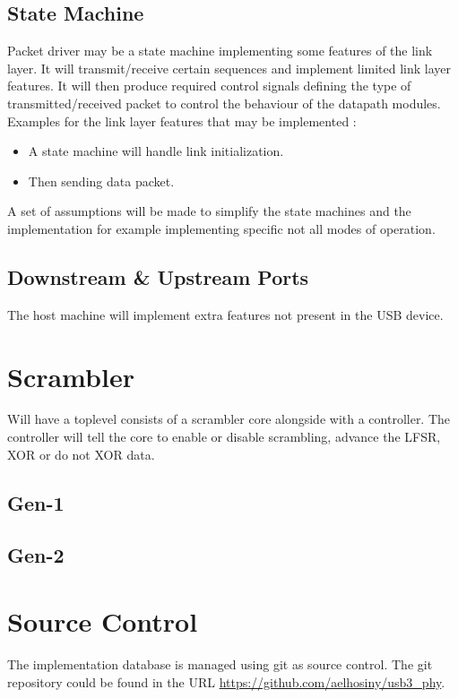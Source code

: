 \documentclass[11pt,a4paper]{article}
\begin{document}
\subsection{State Machine}
Packet driver may be a state machine implementing some features of the link layer. It will transmit/receive certain sequences and implement limited link layer features. It will then produce required control signals defining the type of transmitted/received packet to control the behaviour of the datapath modules.
Examples for the link layer features that may be implemented :
\begin{itemize}
	\item A state machine will handle link initialization.
	\item Then sending data packet.
\end{itemize}

A set of assumptions will be made to simplify the state machines and the implementation for example implementing specific not all modes of operation.

\subsection{Downstream \& Upstream Ports}
The host machine will implement extra features not present in the USB device.


\section{Scrambler}
Will have a toplevel consists of a scrambler core alongside with a controller. The controller will tell the core to enable or disable scrambling, advance the LFSR, XOR or do not XOR data.


\subsection{Gen-1}

\subsection{Gen-2}

\section{Source Control}
The implementation database is managed using git as source control. The git repository could be found in the URL \url{https://github.com/aelhosiny/usb3_phy}.
\end{document}

